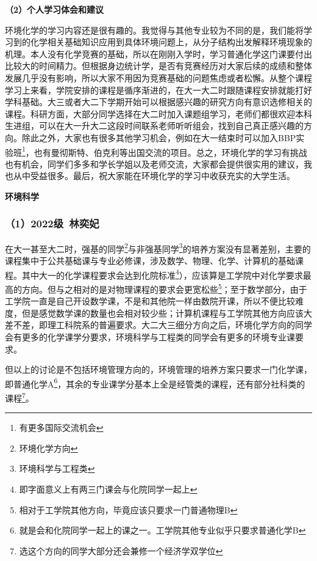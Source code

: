 \vspace{10pt}

\textbf{（2）个人学习体会和建议}

环境化学的学习内容还是很有趣的。我觉得与其他专业较为不同的是，我们能将学习到的化学相关基础知识应用到具体环境问题上，从分子结构出发解释环境现象的机理。本人没有化学竞赛的基础，所以在刚刚入学时，学习普通化学这门课要付出比较大的时间精力。但根据身边统计学，是否有竞赛经历对大家后续的成绩和整体发展几乎没有影响，所以大家不用因为竞赛基础的问题焦虑或者松懈。从整个课程学习上来看，学院安排的课程是循序渐进的，在大一大二时跟随课程安排就能打好学科基础。大三或者大二下学期开始可以根据感兴趣的研究方向有意识选修相关的课程。科研方面，大部分同学选择在大二时加入课题组学习，老师们都很欢迎本科生进组，可以在大一升大二这段时间联系老师听听组会，找到自己真正感兴趣的方向。除此之外，大家也有很多其他学习机会，例如在大一结束时可以加入BBP实验班\footnote{有更多国际交流机会}，也有曼彻斯特、伯克利等出国交流的项目。总之，环境化学的学习有挑战也有机会，同学们多多和学长学姐以及老师交流，大家都会提供很实用的建议，我也从中受益很多。最后，祝大家能在环境化学的学习中收获充实的大学生活。

\vspace{10pt}

\textbf{环境科学}

\subsubsection{（1）2022级\ 林奕妃}

在大一甚至大二时，强基的同学\footnote{环境化学方向}与非强基同学\footnote{环境科学与工程类}的培养方案没有显著差别，主要的课程集中于公共基础课与专业必修课，涉及数学、物理、化学、计算机的基础课程。其中大一的化学课程要求会达到化院标准\footnote{即字面意义上有两三门课会与化院同学一起上}），应该算是工学院中对化学要求最高的方向。但与之相对的是对物理课程的要求会更宽松些\footnote{相对于工学院其他方向，毕竟应该只要求一门普通物理B}；至于数学部分，由于工学院一直是自己开设数学课，不是和其他院一样由数院开课，所以不便比较难度，但是感觉数学课的数量也会相对较少些；计算机课程与工学院其他方向应该大差不差，即理工科院系的普遍要求。大二大三细分方向之后，环境化学方向的同学会有更多的化学课学分要求，环境科学与工程类的同学会有更多的环境专业课要求。

\vspace{10pt}

但以上的讨论是不包括环境管理方向的，环境管理的培养方案只要求一门化学课，即普通化学A\footnote{就是会和化院同学一起上的课之一。工学院其他专业似乎只要求普通化学B}，其余的专业课学分基本上全是经管类的课程，还有部分社科类的课程\footnote{选这个方向的同学大部分还会兼修一个经济学双学位}。

